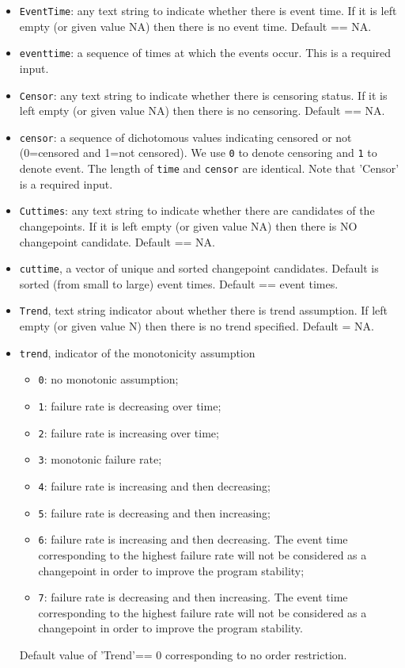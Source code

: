 \documentclass[12pt] {article}
\begin{document}
\begin{itemize}
\item {\tt EventTime}: any text string to indicate whether there is event time. If it is left empty (or given value NA) then there is no event time. Default == NA.
\item {\tt eventtime}: a sequence of times at which the events occur. This is a required input.
\item {\tt Censor}: any text string to indicate whether there is censoring status. If it is left empty (or given value NA) then there is no censoring. Default == NA.
\item {\tt censor}: a sequence of dichotomous values indicating censored or not (0=censored and 1=not censored).
    We use {\tt 0} to denote censoring and {\tt 1} to denote event. The length of {\tt time} and {\tt censor} are identical. Note that 'Censor' is a required input.
\item {\tt Cuttimes}: any text string to indicate whether there are candidates of the changepoints. If it is left empty (or given value NA) then there is NO changepoint candidate. Default == NA.
\item {\tt cuttime}, a vector of unique and sorted changepoint candidates. Default is sorted (from small to large) event times. Default == event times.
\item {\tt Trend}, text string indicator about whether there is trend assumption. If left empty (or given value N) then there is no trend specified. Default = NA.
\item {\tt trend}, indicator of the monotonicity assumption
    \begin{itemize}
        \item {\tt 0}: no monotonic assumption;
        \item {\tt 1}: failure rate is decreasing over time;
        \item {\tt 2}: failure rate is increasing over time;
        \item {\tt 3}: monotonic failure rate;
        \item {\tt 4}: failure rate is increasing and then decreasing;
        \item {\tt 5}: failure rate is decreasing and then increasing;
        \item {\tt 6}: failure rate is increasing and then decreasing. The event time corresponding to the highest failure rate will not be considered as a changepoint in order to improve the program stability;
        \item {\tt 7}: failure rate is decreasing and then increasing. The event time corresponding to the highest failure rate will not be considered as a changepoint in order to improve the program stability.
    \end{itemize}
    Default value of 'Trend'== 0 corresponding to no order restriction.
\end{itemize}
\end{document}
